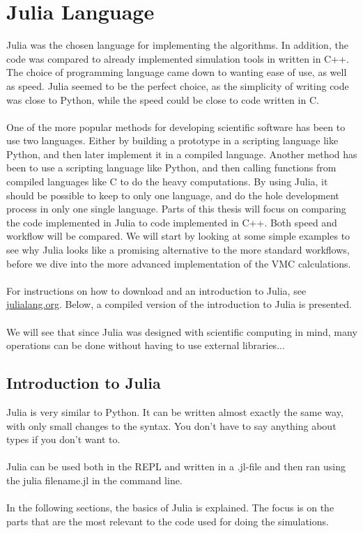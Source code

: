 \section{Julia Language}
Julia was the chosen language for implementing the algorithms. In addition, the code was compared to already implemented simulation tools in written in C++. The choice of programming language came down to wanting ease of use, as well as speed. Julia seemed to be the perfect choice, as the simplicity of writing code was close to Python, while the speed could be close to code written in C. 
\\
\\
One of the more popular methods for developing scientific software has been to use two languages. Either by building a prototype in a scripting language like Python, and then later implement it in a compiled language. Another method has been to use a scripting language like Python, and then calling functions from compiled languages like C to do the heavy computations. By using Julia, it should be possible to keep to only one language, and do the hole development process in only one single language. Parts of this thesis will focus on comparing the code implemented in Julia to code implemented in C++. Both speed and workflow will be compared. We will start by looking at some simple examples to see why Julia looks like a promising alternative to the more standard workflows, before we dive into the more advanced implementation of the VMC calculations. 
\\
\\
For instructions on how to download and an introduction to Julia, see \url{julialang.org}. Below, a compiled version of the introduction to Julia is presented.
\\
\\
We will see that since Julia was designed with scientific computing in mind, many operations can be done without having to use external libraries...
\subsection{Introduction to Julia}
Julia is very similar to Python. It can be written almost exactly the same way, with only small changes to the syntax. You don't have to say anything about types if you don't want to.
\\
\\
Julia can be used both in the REPL and written in a .jl-file and then ran using the julia filename.jl in the command line. 
\\
\\
In the following sections, the basics of Julia is explained. The focus is on the parts that are the most relevant to the code used for doing the simulations.  
